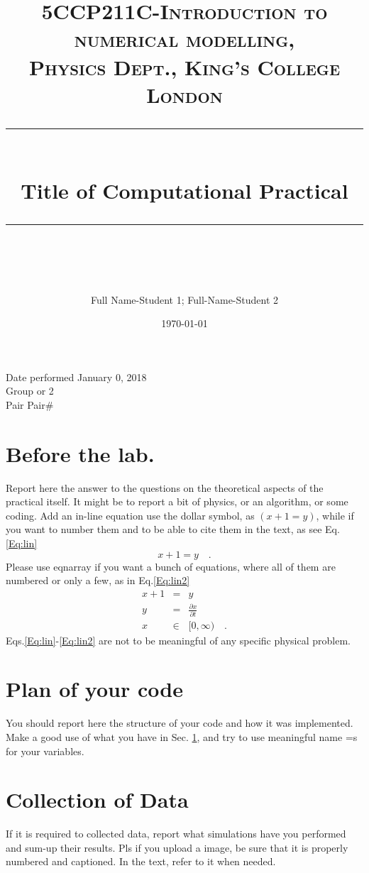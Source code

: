 \documentclass{article} %
\title{
\normalfont \normalsize 
\textsc{5CCP211C-Introduction to numerical modelling, \\Physics Dept., King's College London} \\
[10pt] 
\rule{\linewidth}{0.5pt} \\[6pt] 
\huge Title of Computational Practical \\
\rule{\linewidth}{2pt}  \\[10pt]
}
\author{Full Name-Student 1; Full-Name-Student 2}
\date{\normalsize \today}
\begin{document}
\maketitle
\noindent
Date performed \dotfill January 0, 2018 \\
Group  or 2 \\
Pair \dotfill Pair\# \\

\section{Before the lab.}
\label{Sec:before}
Report here the answer to the questions on the theoretical aspects of the practical itself. It might be to report a bit of physics, or an algorithm, or some coding.
Add an in-line equation use the dollar symbol, as $\left(x+1 = y\right)$, while if you want to number them and to be able to cite them in the text, as see Eq.\ref{Eq:lin}
\begin{equation}
x+1 = y  \mbox{~~~.}
\label{Eq:lin}
\end{equation}
Please use eqnarray if you want a bunch of equations, where all of them are numbered or only a few, as in Eq.\ref{Eq:lin2}
\begin{eqnarray}
\nonumber
x+1 &=& y \\  
y &=&  \frac{\partial x}{\partial t} \\
\nonumber x &\in& [0,\infty)   \mbox{~~~.}
\label{Eq:lin2}
\end{eqnarray}
Eqs.\ref{Eq:lin}-\ref{Eq:lin2} are not to be meaningful of any specific physical problem.

\section{Plan of your code}
You should report here the structure of your code and how it was implemented.
Make a good use of what you have in Sec. \ref{Sec:before}, and try to use meaningful name =s for your variables.

\section {Collection of Data}
If it is required to collected data, report what simulations have you performed and sum-up their results. Pls if you upload a image, be sure that it is properly numbered and captioned. In the text, refer to it when needed.

\end{document}
